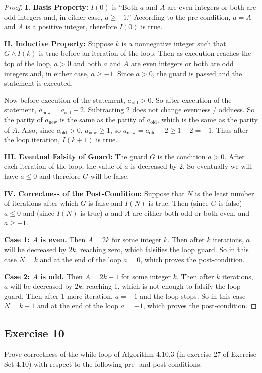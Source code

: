 \documentclass[14pt]{extarticle}
\begin{document}
\begin{proof}
{\bf I. Basis Property:} $I(0)$ is ``Both $a$ and $A$ are even integers or both are odd integers and, in either case, $a \geq -1$.'' According to the pre-condition, $a = A$ and $A$ is a positive integer, therefore $I(0)$ is true. 

{\bf II. Inductive Property:} Suppose $k$ is a nonnegative integer such that $G \wedge I(k)$ is true before an 
iteration of the loop. Then as execution reaches the top of the loop, $a > 0$ and both $a$ and $A$ are even integers or
both are odd integers and, in either case, $a \geq -1$. Since $a > 0$, the guard is passed and the statement is 
executed. 

Now before execution of the statement, $a_{\text{old}} > 0$. So after execution of the statement, 
$a_{\text{new}} = a_{\text{old}} - 2$. Subtracting 2 does not change evenness / oddness. So the parity of 
$a_{\text{new}}$ is the same as the parity of $a_{\text{old}}$, which is the same as the parity of $A$. 
Also, since $a_{\text{old}} > 0$, $a_{\text{new}} \geq 1$, so $a_{\text{new}} = a_{\text{old}} - 2 \geq 1 - 2 = -1$.
Thus after the loop iteration, $I(k + 1)$ is true. 

{\bf III. Eventual Falsity of Guard:} The guard $G$ is the condition $a > 0$. After each iteration of the loop, the 
value of $a$ is decreased by 2. So eventually we will have $a \leq 0$ and therefore $G$ will be false. 

{\bf IV. Correctness of the Post-Condition:} Suppose that $N$ is the least number of iterations after which $G$ is false and $I(N)$ is true. Then (since $G$ is false) $a \leq 0$ and (since $I(N)$ is true) $a$ and $A$ are either both odd or both even, and $a \geq -1$. 

{\bf Case 1: $A$ is even.} Then $A = 2k$ for some integer $k$. Then after $k$ iterations, $a$ will be decreased by 
$2k$, reaching zero, which falsifies the loop guard. So in this case $N = k$ and at the end of the loop $a = 0$, 
which proves the post-condition.

{\bf Case 2: $A$ is odd.} Then $A = 2k+1$ for some integer $k$. Then after $k$ iterations, $a$ will be decreased by
$2k$, reaching 1, which is not enough to falsify the loop guard. Then after 1 more iteration, $a = -1$ and the loop 
stops. So in this case $N = k+1$ and at the end of the loop $a = -1$, which proves the post-condition.
\end{proof}

\subsection{Exercise 10}
Prove correctness of the while loop of Algorithm 4.10.3 (in exercise 27 of Exercise Set 4.10) with respect to the
following pre- and post-conditions: 
\end{document}
